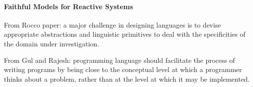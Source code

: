 \paragraph{Faithful Models for Reactive Systems} \label{sec::Faithfulness}
From Rocco paper: a major challenge in designing languages is to devise appropriate abstractions and linguistic primitives to deal with the specificities of the domain under investigation.

From Gul and Rajesh: 
programming language should facilitate the process of writing programs by being close to the conceptual level at which a programmer thinks about a problem, rather than at the level at which it may be implemented. 